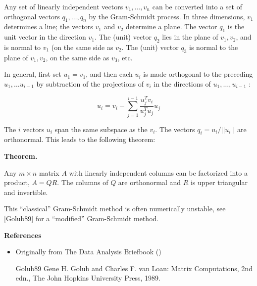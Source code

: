 \documentclass{article}
\begin{document}
Any set of linearly independent vectors $v_1,\ldots,v_n$ can be converted into a set of orthogonal vectors $q_1,\ldots,q_n$ by the Gram-Schmidt process. In three dimensions, $v_1$ determines a line; the vectors $v_1$ and $v_2$ determine a plane. The vector $q_1$ is the unit vector in the direction $v_1$. The (unit) vector $q_2$ lies in the plane of $v_1, v_2$, and is normal to $v_1$ (on the same side as $v_2$. The (unit) vector $q_3$ is normal to the plane of $v_1, v_2$, on the same side as $v_3$, etc.

In general, first set $u_1 = v_1$, and then each $u_i$ is made orthogonal to the preceding $u_1,\ldots u_{i-1}$ by subtraction of the projections of $v_i$ in the directions of $u_1,\ldots,u_{i-1}$ :

$$ u_i = v_i - \sum_{j=1}^{i-1} \frac{u_j^Tv_i}{u_j^Tu_j} u_j$$

The $i$ vectors $u_i$ span the same subspace as the $v_i$. The vectors $q_i=u_i/||u_i||$ are orthonormal. This leads to the following theorem:

{\bf Theorem.}

Any $m \times n$ matrix $A$ with linearly independent columns can be factorized into a product, $A = QR$. The columns of $Q$ are orthonormal and $R$ is upper triangular and invertible.

This ``classical'' Gram-Schmidt method is often numerically unstable, see [Golub89] for a ``modified'' Gram-Schmidt method.

{\bf References}

\begin{itemize}
\item Originally from The Data Analysis Briefbook
()
\end{itemize}

\begin{itemize}
\item[Golub89] Gene H. Golub and Charles F. van Loan: Matrix Computations, 2nd edn., The John Hopkins University Press, 1989.
\end{itemize}
\end{document}
